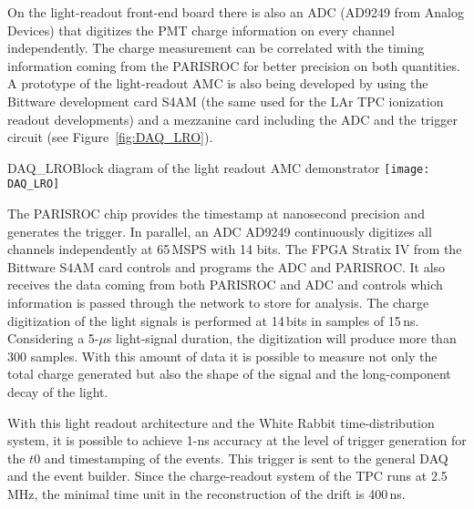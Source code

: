 On the light-readout front-end board there is also an ADC (AD9249 from
Analog Devices) that digitizes the PMT charge information on every
channel independently. The charge measurement can be correlated with
the timing information coming from the PARISROC for better precision
on both quantities. A prototype of the light-readout AMC is also being
developed by using the Bittware development card S4AM (the same used
for the LAr TPC ionization readout developments) and a mezzanine card
including the ADC and the trigger circuit (see
Figure~\ref{fig:DAQ_LRO}).
\begin{cdrfigure}{DAQ_LRO}{Block diagram of the light readout AMC demonstrator}
 \texttt{[image: DAQ\_LRO]}  
\end{cdrfigure}

The PARISROC chip provides the timestamp at nanosecond precision and
generates the trigger. In parallel, an ADC AD9249 continuously
digitizes all channels independently at 65\,MSPS with 14 bits. The FPGA
Stratix IV from the Bittware S4AM card controls and programs the ADC
and PARISROC. It also receives the data coming from both PARISROC and
ADC and controls which information is passed through the network to
store for analysis.  The charge digitization of the light signals is
performed at 14\,bits in samples of 15\,ns. Considering a 5-$\mu$s
light-signal duration, the digitization will produce more than 300
samples. With this amount of data it is possible to measure not only
the total charge generated but also the shape of the signal and the
long-component decay of the light.


With this light readout architecture and the White Rabbit
time-distribution system, it is possible to achieve 1-ns accuracy at
the level of trigger generation for the $t0$ and timestamping of the
events. This trigger is sent to the general DAQ and the event
builder. Since the charge-readout system of the TPC runs at 2.5\,MHz,
the minimal time unit in the reconstruction of the drift is 400\,ns.
